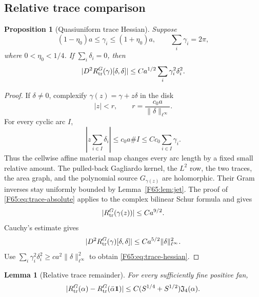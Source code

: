 \documentclass[11pt]{amsart}
\numberwithin{equation}{section}
\newtheorem{proposition}[theorem]{Proposition}
\newtheorem{lemma}[theorem]{Lemma}
\theoremstyle{definition}
\theoremstyle{remark}
\newcommand{\Jfour}{\mathfrak J_4}
\begin{document}
\subsection{Relative trace comparison}

\begin{proposition}[Quasiuniform trace Hessian]\label{F65:prop:trace-hessian}
Suppose
\begin{equation}\label{F65:eq:quasiuniform}
 (1-\eta_0)a\le\gamma_i\le(1+\eta_0)a,
 \qquad \sum_i\gamma_i=2\pi,
\end{equation}
where $0<\eta_0<1/4$.  If $\sum_i\delta_i=0$, then
\begin{equation}\label{F65:eq:trace-hessian}
 |D^2R_{\rm tr}^G(\gamma)[\delta,\delta]|
 \le Ca^{1/2}\sum_i\gamma_i^2\delta_i^2.
\end{equation}
\end{proposition}

\begin{proof}
If $\delta\ne0$, complexify
$\gamma(z)=\gamma+z\delta$ in the disk
\begin{equation}
 |z|<r,\qquad r=\frac{c_0a}{\|\delta\|_{\ell^\infty}}.
\end{equation}
For every cyclic arc $I$,
\begin{equation}
 \left|z\sum_{i\in I}\delta_i\right|
 \le c_0a\#I
 \le Cc_0\sum_{i\in I}\gamma_i.
\end{equation}
Thus the cellwise affine material map changes every arc length by a fixed
small relative amount.  The pulled-back Gagliardo kernel, the $L^2$ row,
the two traces, the area graph, and the polynomial source $G_{\gamma(z)}$
are holomorphic.  Their Gram inverses stay uniformly bounded by
Lemma~\ref{F65:lem:jet}.  The proof of \eqref{F65:eq:trace-absolute} applies to the
complex bilinear Schur formula and gives
\begin{equation}
 |R_{\rm tr}^G(\gamma(z))|\le Ca^{9/2}.
\end{equation}
Cauchy's estimate gives
\begin{equation}
 |D^2R_{\rm tr}^G(\gamma)[\delta,\delta]|
 \le Ca^{5/2}\|\delta\|_{\ell^\infty}^2.
\end{equation}
Use
$\sum_i\gamma_i^2\delta_i^2\ge c a^2
\|\delta\|_{\ell^\infty}^2$ to obtain \eqref{F65:eq:trace-hessian}.
\end{proof}

\begin{lemma}[Relative trace remainder]\label{F65:lem:trace-relative}
For every sufficiently fine positive fan,
\begin{equation}\label{F65:eq:trace-relative}
 |R_{\rm tr}^G(\alpha)-R_{\rm tr}^G(\bar\alpha\mathbf1)|
 \le C(S^{1/4}+S^{1/2})\Jfour(\alpha).
\end{equation}
\end{lemma}
\end{document}
